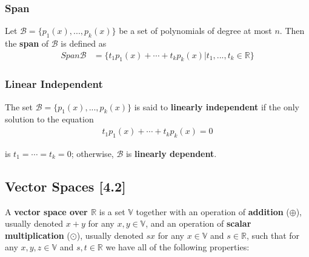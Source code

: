\documentclass[a4paper,9pt]{extarticle}
\begin{document}
\begin{multicols*}{2}

\subsubsection{Span}
Let $\mathcal{B} = \{p_1(x), ..., p_k(x)\}$ be a set of polynomials of degree at most $n$. Then the \textbf{span} of $\mathcal{B}$ is defined as 
\begin{equation} \label{4.1-1}
    \begin{split}
        Span \mathcal{B} & = \{t_1 p_1(x) + \cdots + t_k p_k(x) | t_1, ..., t_k \in \mathbb{R}\}
    \end{split}
\end{equation}


\subsubsection{Linear Independent}
The set $\mathcal{B} = \{p_1(x), ..., p_k(x)\}$ is said to \textbf{linearly independent} if the only solution to the equation 
\begin{equation} \label{4.1-2}
    \begin{split}
        t_1 p_1(x) + \cdots + t_k p_k(x) = 0
    \end{split}
\end{equation}

is $t_1 = \cdots = t_k = 0$; otherwise, $\mathcal{B}$ is \textbf{linearly dependent}.


\subsection{Vector Spaces [4.2]}
A \textbf{vector space over $\mathbb{R}$} is a set $\mathbb{V}$ together with an operation of \textbf{addition} ($\oplus$), usually denoted $x + y$ for any $x, y \in \mathbb{V}$, and an operation of \textbf{scalar multiplication} ($\odot$), usually denoted $s x$ for any $x \in \mathbb{V}$ and $s \in \mathbb{R}$, such that for any $x, y, z \in \mathbb{V}$ and $s, t \in \mathbb{R}$ we have all of the following properties:


\end{multicols*}
\end{document}
